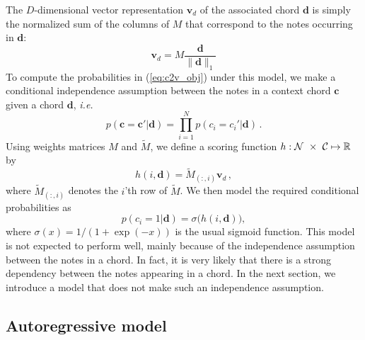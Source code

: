 \documentclass{article}
\newcommand{\M}{\tilde{M}}
\newcommand{\boldc}{\boldsymbol c}
\newcommand{\boldd}{\boldsymbol d}
\newcommand{\boldvd}{\boldsymbol v_d}
\newcommand{\ie}{\textit{i.e.}}
\begin{document}
The $D$-dimensional vector representation $\boldvd$ of the associated chord $\boldd$ is simply the normalized sum of the columns of $M$ that correspond to the notes occurring in $\boldd$:
\[ \boldvd = M\frac{ \boldd}{\| \boldd \|_1}
\]
To compute the probabilities in (\ref{eq:c2v_obj}) under this model, we make a  conditional independence assumption between the notes in a context chord $\boldc$ given a chord $\boldd$, \ie\
%
\begin{equation}
p(\boldc =\boldc' | \boldd) = \prod_{i=1}^N  p(c_i =c_i'|  \boldd) \,.
\end{equation} 
%
Using weights matrices $M$ and $\M$, we define a scoring function $\nobreak{h: \mathcal{N}~\times~\mathcal{C}\mapsto\mathbb{R}}$ by
\begin{equation}
h(i,\boldd) =  \M_{(:,i)} \boldvd \,,
\end{equation}
where $\M_{(:,i)}$ denotes the $i$'th row of $\M$. We then model the required conditional probabilities as
\begin{equation}
p(c_i =1|\boldd) = \sigma\big( h(i,\boldd) \big),
\end{equation}
where $\sigma(x)=1/(1+\exp(-x))$ is the usual sigmoid function.
This model is not expected to perform well, mainly because of the independence assumption between the notes in a chord. In fact, it is very likely that there is a strong dependency between the notes appearing in a chord. In the next section, we introduce a model that does not make such an independence assumption. 

\subsection{Autoregressive model}
\end{document}
